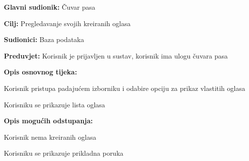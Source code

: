 					\noindent {}
					\begin{packed_item}
						
						\item \textbf{Glavni sudionik: } Čuvar pasa
						\item  \textbf{Cilj:} Pregledavanje svojih kreiranih oglasa
						\item  \textbf{Sudionici:} Baza podataka 
						\item  \textbf{Preduvjet:} Korisnik je prijavljen u sustav, korisnik ima ulogu čuvara pasa
						\item  \textbf{Opis osnovnog tijeka:}
						
						\item[] \begin{packed_enum}
							
							\item Korisnik pristupa padajućem izborniku i odabire opciju za prikaz vlastitih oglasa 
							\item Korisniku se prikazuje lista oglasa
							
						\end{packed_enum}
						
						\item  \textbf{Opis mogućih odstupanja:}
						
						\item[] \begin{packed_item}
							
							\item[2.a] Korisnik nema kreiranih oglasa
							\item[] \begin{packed_enum}
								
								\item Korisniku se prikazuje prikladna poruka
								
							\end{packed_enum}
						\end{packed_item}
					\end{packed_item}	
				
